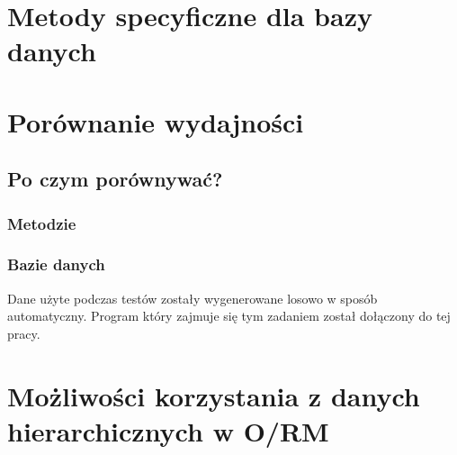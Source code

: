 \documentclass[12pt,a4paper,intlimits,oneside]{report}
\begin{document}
\chapter{Metody specyficzne dla bazy danych}
	
	
	

	
	

\chapter{Porównanie wydajności}
\section{Po czym porównywać?}
\subsection{Metodzie}
\subsection{Bazie danych}



Dane użyte podczas testów zostały wygenerowane losowo w sposób automatyczny. Program który zajmuje się tym zadaniem został dołączony do tej pracy.

\chapter{Możliwości korzystania z danych hierarchicznych w O/RM}
\end{document}
